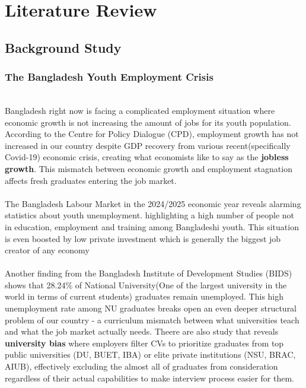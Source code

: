 \documentclass[a4paper, 14pt, openany]{extreport}
\begin{document}
	\chapter{Literature Review}
	
	\section{Background Study}
	
	\subsection{The Bangladesh Youth Employment Crisis}
	\\
	Bangladesh right now is facing a complicated employment situation where economic growth is not increasing the amount of jobs for its youth population. According to the Centre for Policy Dialogue (CPD), employment growth has not increased in our country despite GDP recovery from various recent(specifically Covid-19) economic crisis, creating what economists like to say as the \textbf{jobless growth}\cite{cpd_employment_2024}. This mismatch between economic growth and employment stagnation affects fresh graduates entering the job market.
	\\
	\\
	The Bangladesh Labour Market in the 2024/2025 economic year reveals alarming statistics about youth unemployment. highlighting a high number of people not in education, employment and training among Bangladeshi youth\cite{bangladesh_labour_market_2024}. This situation is even boosted by low private investment which is generally the biggest job creator of any economy
	\\
	\\
	Another finding from the Bangladesh Institute of Development Studies (BIDS) shows that 28.24\% of National University(One of the largest university in the world in terms of current students) graduates remain unemployed\cite{dhaka_tribune_nu_graduates}. This high unemployment rate among NU graduates breaks open an even deeper structural problem of our country - a curriculum mismatch between what universities teach and what the job market actually needs. Theere are also study that reveals \textbf{university bias} where employers filter CVs to prioritize graduates from top public universities (DU, BUET, IBA) or elite private institutions (NSU, BRAC, AIUB), effectively excluding the almost all of graduates from consideration regardless of their actual capabilities to make interview process easier for them.
	
\end{document}
